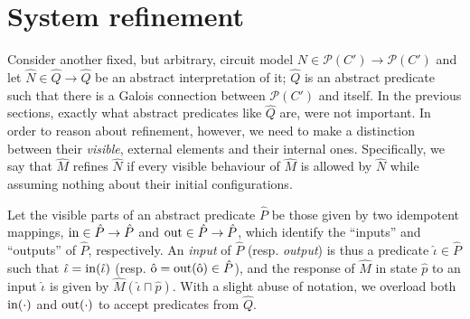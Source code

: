 \section{System refinement}

Consider another fixed, but arbitrary, circuit model $N \in \mathcal{P}(C') \rightarrow \mathcal{P}(C')$ and let $\hat N \in \hat Q \rightarrow \hat Q$ be an abstract interpretation of it; $\hat Q$ is an abstract predicate such that there is a Galois connection between $\mathcal{P}(C')$ and itself. In the previous sections, exactly what abstract predicates like $\hat Q$ are, were not important. In order to reason about refinement, however, we need to make a distinction between their \textit{visible}, external elements and their internal ones. Specifically, we say that $\hat M$ refines $\hat N$ if every visible behaviour of $\hat M$ is allowed by $\hat N$ while assuming nothing about their initial configurations.

Let the visible parts of an abstract predicate $\hat P$ be those given by two idempotent mappings, $\operatorname{in} \in \hat P \rightarrow \hat P$ and $\operatorname{out} \in \hat P \rightarrow \hat P$, which identify the ``inputs'' and ``outputs'' of $\hat P$, respectively. An \textit{input} of $\hat P$ (resp. \textit{output}) is thus a predicate $\hat \iota \in \hat P$ such that $\hat \iota = \operatorname{in}(\hat \iota)$ (resp. $\hat {\mathrm{o}} = \operatorname{out}(\hat {\mathrm{o}}) \in \hat P$), and the response of $\hat M$ in state $\hat p$ to an input $\hat \iota$ is given by $\hat M(\hat \iota \sqcap \hat p)$. With a slight abuse of notation, we overload both $\operatorname{in}(\cdot)$ and $\operatorname{out}(\cdot)$ to accept predicates from $\hat Q$.





